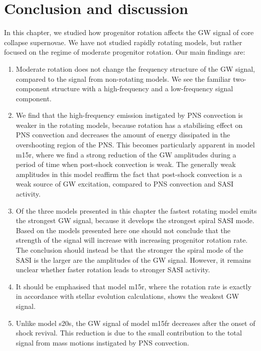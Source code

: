 \section{Conclusion and discussion}
In this chapter, we studied how progenitor rotation affects the GW signal of core collapse supernovae.
We have not studied rapidly rotating models, but rather focused on the regime of moderate progenitor rotation.
Our main findings are:
\begin{enumerate}
\item Moderate rotation does not change the frequency structure of the GW signal, compared to the signal from non-rotating models.
We see the familiar two-component structure with a high-frequency and a low-frequency signal component.
\item We find that the high-frequency emission instigated by PNS convection is weaker in the rotating models, because rotation has a 
stabilising effect on PNS convection and decreases the amount of energy dissipated in the overshooting region of the PNS.
This becomes particularly apparent in model m15r, where we find a strong reduction of the GW amplitudes during a 
period of time when post-shock convection is weak. The generally weak amplitudes in this model reaffirm the fact that post-shock convection is a weak source of GW excitation, compared to PNS convection and SASI activity.
\item Of the three models presented in this chapter the fastest rotating model emits the strongest GW signal,
because it develops the strongest spiral SASI mode. Based on the models presented here one should not conclude
that the strength of the signal will increase with increasing progenitor rotation rate. The conclusion should instead be
that the stronger the spiral mode of the SASI is the larger are the amplitudes of the GW signal. However, it remains unclear
whether faster rotation leads to stronger SASI activity.
\item It should be emphasised that model m15r, where the rotation rate is exactly in accordance with stellar evolution
calculations, shows the weakest GW signal.  
\item Unlike model s20s, the GW signal of model m15fr decreases after the onset of shock revival. This reduction is due to
the small contribution to the total signal from mass motions instigated by PNS convection.
\end{enumerate}


